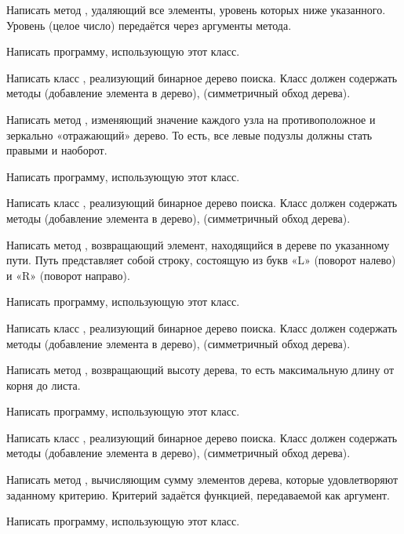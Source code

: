 Написать метод , удаляющий все элементы, уровень которых
ниже указанного. Уровень (целое число) передаётся через аргументы
метода.

Написать программу, использующую этот класс.

\task Написать класс , реализующий бинарное дерево
поиска. Класс должен содержать методы  (добавление элемента в
дерево),  (симметричный обход дерева).

Написать метод , изменяющий значение каждого узла на
противоположное и зеркально «отражающий» дерево. То есть, все
левые подузлы должны стать правыми и наоборот.

Написать программу, использующую этот класс.

\task Написать класс , реализующий бинарное дерево
поиска. Класс должен содержать методы  (добавление элемента в
дерево),  (симметричный обход дерева).

Написать метод , возвращающий элемент, находящийся в
дереве по указанному пути. Путь представляет собой
строку, состоящую из букв «L» (поворот налево) и «R» (поворот
направо).

Написать программу, использующую этот класс.

\task Написать класс , реализующий бинарное дерево
поиска. Класс должен содержать методы  (добавление элемента в
дерево),  (симметричный обход дерева).

Написать метод , возвращающий высоту дерева, то есть
максимальную длину от корня до листа.

Написать программу, использующую этот класс.

\task Написать класс , реализующий бинарное дерево
поиска. Класс должен содержать методы  (добавление элемента в
дерево),  (симметричный обход дерева).

Написать метод , вычисляющим сумму элементов дерева, которые
удовлетворяют заданному критерию. Критерий задаётся функцией,
передаваемой как аргумент.

Написать программу, использующую этот класс.
